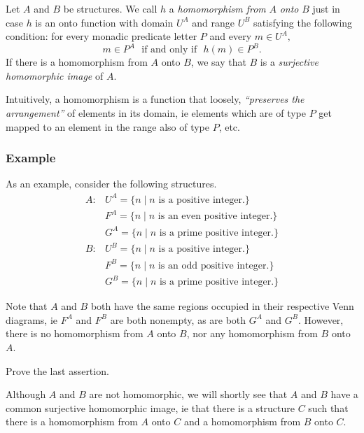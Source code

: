 Let $A$ and $B$ be structures. We call $h$ a {\em homomorphism from}
$A$ {\em onto} $B$ just in case $h$ is an onto function with domain $U^A$
and range $U^B$ satisfying the following condition:
for every monadic predicate letter $P$ and every $m \in U^A,$
\[ m \in P^A\ \ \ \mbox{if and only if}\ \ \ h(m) \in P^B.\]
If there is a homomorphism from $A$ onto $B$, we say that $B$ is a {\em
surjective homomorphic image} of $A.$

\begin{aside}
    Intuitively, a homomorphism is a function that loosely, \emph{``preserves the arrangement''} of elements in its domain, ie elements which are of type $P$ get mapped to an element in the range also of type $P$, etc.
\end{aside}

\subsubsection*{Example}

As an example, consider the following structures.
\[
\begin{array}{ll}
A: & U^A=\{n\mid n\mbox{ is a positive integer.}\}\\ 
 & F^A=\{n\mid n\mbox{ is an even positive integer.}\}\\ 
 & G^A=\{n\mid n\mbox{ is a prime positive integer.}\}
\end{array}
\]
\[
\begin{array}{ll}
B: & U^B=\{n\mid n\mbox{ is a positive integer.}\}\\ 
 & F^B=\{n\mid n\mbox{ is an odd positive integer.}\}\\ 
 & G^B=\{n\mid n\mbox{ is a prime positive integer.}\}
\end{array}
\]

Note that $A$ and $B$ both have the same regions occupied in their respective Venn diagrams, ie $F^A$ and $F^B$ are both nonempty, as are both $G^A$ and $G^B$. However, there is no homomorphism from $A$ onto $B$, nor any homomorphism from $B$ onto $A$. 

\begin{aside}
    Prove the last assertion. 
\end{aside}

Although $A$ and $B$ are not homomorphic, we will shortly see that $A$ and $B$ have a common surjective homomorphic image, ie that there is a structure $C$ such that there is a homomorphism from $A$ onto $C$ and a homomorphism from $B$ onto $C$.





